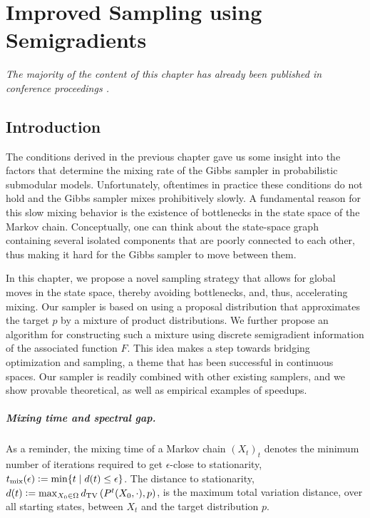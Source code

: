 \chapter{Improved Sampling using Semigradients} \label{ch:m3}

\emph{The majority of the content of this chapter has already been published in conference proceedings \citep{gotovos18}.}

\section{Introduction}
The conditions derived in the previous chapter gave us some insight into the factors that determine the mixing rate of the Gibbs sampler in probabilistic submodular models.
Unfortunately, oftentimes in practice these conditions do not hold and the Gibbs sampler mixes prohibitively slowly.
A fundamental reason for this slow mixing behavior is the existence of bottlenecks in the state space of the Markov chain.
Conceptually, one can think about the state-space graph containing several isolated components that are poorly connected to each other, thus making it hard for the Gibbs sampler to move between them.

In this chapter, we propose a novel sampling strategy that allows for global moves in the state space, thereby avoiding bottlenecks, and, thus, accelerating mixing.
Our sampler is based on using a proposal distribution that approximates the target $p$ by a mixture of product distributions.
We further propose an algorithm for constructing such a mixture using discrete semigradient information of the associated function $F$.
This idea makes a step towards bridging optimization and sampling, a theme that has been successful in continuous spaces.
Our sampler is readily combined with other existing samplers, and we show provable theoretical, as well as empirical examples of speedups.

\paragraph{Mixing time and spectral gap.}
As a reminder, the mixing time of a Markov chain $(X_t)_t$ denotes the minimum number of iterations required to get $\epsilon$-close to stationarity, $t_{\mathrm{mix}}(\epsilon) \vcentcolon= \min \{ t \mid d(t) \leq \epsilon \}$.
The distance to stationarity, $d(t) \vcentcolon= \max_{X_0 \in \Omega} d_{\textrm{TV}}\left( P^t(X_0, \cdot), p \right)$, is the maximum total variation distance, over all starting states, between $X_t$ and the target distribution $p$.


